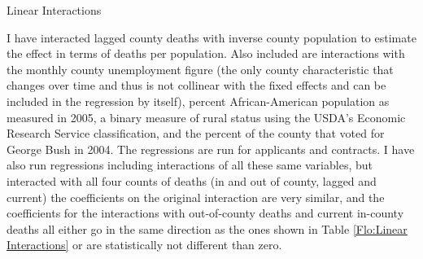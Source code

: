 \documentclass[12pt] {article}
\begin{document}
\begin{table}
\caption{Linear Interactions}
\label{Flo:Linear Interactions}
\end{table}

I have interacted lagged county deaths with inverse county population to estimate the effect in terms of deaths per population. Also included are interactions with the monthly county unemployment figure (the only county characteristic
that changes over time and thus is not collinear with the fixed effects
and can be included in the regression by itself), percent African-American
population as measured in 2005, %
a binary measure of rural status using the USDA's Economic Research Service classification, and the percent of the county that voted for George Bush in 2004.
The regressions are run for applicants and contracts.%
I have also run regressions including interactions of all these same
variables, but interacted with all four counts of deaths (in and out
of county, lagged and current) the coefficients on the original interaction
are very similar, and the coefficients for the interactions with out-of-county
deaths and current in-county deaths all either go in the same direction
as the ones shown in Table \ref{Flo:Linear Interactions} or are
statistically not different than zero. 


\end{document}
